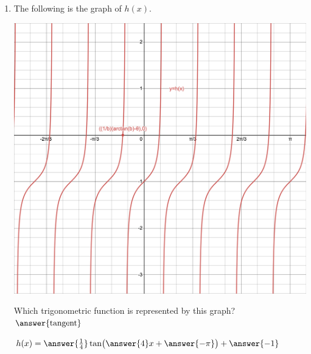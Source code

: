 \documentclass{ximera}
\begin{document}
\begin{exercise}
\begin{enumerate}
\item The following is the graph of $h(x)$.
\begin{center}
\includegraphics[width=1\linewidth]{tanGraphwithHintpoint.png}
\end{center}
Which trigonometric function is represented by this graph?\\
$\answer{\text{tangent}}$
\begin{exercise}
	$h(x) = \answer{\frac{1}{4}}\tan\!\big(\answer{4}x + \answer{-\pi}\big)+\answer{-1}$
\end{exercise}
	
\end{enumerate}
\end{exercise}
\end{document}
